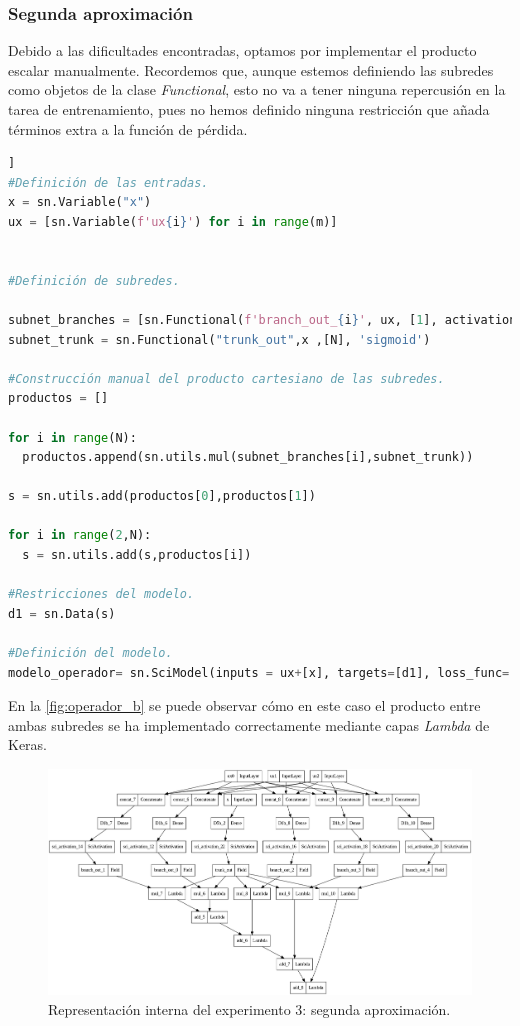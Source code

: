 \subsubsection{Segunda aproximación}\label{sec:8.4.4.2}

Debido a las dificultades encontradas, optamos por implementar el producto escalar manualmente. Recordemos que, aunque estemos definiendo las subredes como objetos de la clase \textit{Functional}, esto no va a tener ninguna repercusión en la tarea de entrenamiento, pues no hemos definido ninguna restricción que añada términos extra a la función de pérdida. 

\begin{lstlisting}[language=Python,caption={Segunda aproximación para el modelo de aprendizaje de operadores.},label={lst:exp3-aprox2}]]
#Definición de las entradas.
x = sn.Variable("x")
ux = [sn.Variable(f'ux{i}') for i in range(m)]


#Definición de subredes.

subnet_branches = [sn.Functional(f'branch_out_{i}', ux, [1], activation='tanh') for i in range(N)]
subnet_trunk = sn.Functional("trunk_out",x ,[N], 'sigmoid')

#Construcción manual del producto cartesiano de las subredes.
productos = []

for i in range(N):
  productos.append(sn.utils.mul(subnet_branches[i],subnet_trunk))

s = sn.utils.add(productos[0],productos[1])

for i in range(2,N):
  s = sn.utils.add(s,productos[i])

#Restricciones del modelo.
d1 = sn.Data(s)

#Definición del modelo.
modelo_operador= sn.SciModel(inputs = ux+[x], targets=[d1], loss_func='MSE',optimizer="adam")
\end{lstlisting}

En la \autoref{fig:operador_b} se puede observar cómo en este caso el producto entre ambas subredes se ha implementado correctamente mediante capas \textit{Lambda} de Keras. 
 \begin{figure}[htbp]
    \centering
    \includegraphics[width=\textwidth]{img/operador_b.png}
    \caption{Representación interna del experimento 3: segunda aproximación.}
    \label{fig:operador_b}
\end{figure}


